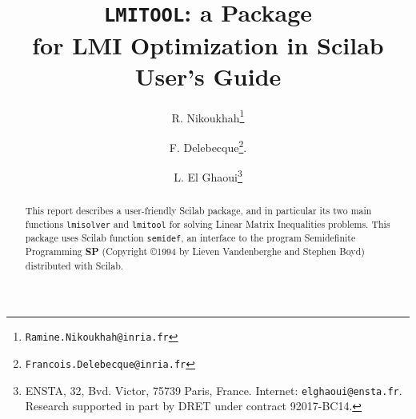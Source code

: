 \documentclass{article}
\begin{document}
\def\lmitool{{\tt LMITOOL}}
\def\dsp{\displaystyle}
\def\reals{{\bf R}}
\def\BEQ{\begin{equation}}
\def\EEQ{\end{equation}}
\def\eg{{\em e.g.}}
\def\ie{{\em i.e.}}
\def\Tr{{\mathop{\bf Tr}}}
\def\diag{{\mathop{\bf diag}}}
\def\eqbydef{\mathrel{\stackrel{\Delta}{=}}}

\title{\lmitool:
a Package \\ for LMI Optimization in Scilab\\[0.5in]
User's Guide}
\date{}
\author{R. Nikoukhah\thanks{{\tt Ramine.Nikoukhah@inria.fr}}
\and
F. Delebecque\thanks{\tt Francois.Delebecque@inria.fr}.  
\and
L. El Ghaoui\thanks{ENSTA, 32, Bvd. Victor, 75739 Paris, France.
Internet: {\tt elghaoui@ensta.fr}.  Research supported in part by DRET
under contract  92017-BC14.}
}

\maketitle

\begin{abstract}
This report describes a user-friendly Scilab package, and in
particular its two main functions {\tt lmisolver} and
{\tt lmitool} for solving
Linear Matrix Inequalities problems.  This package
uses Scilab function {\tt semidef}, an interface to the program 
Semidefinite Programming {\bf SP} (Copyright \copyright 1994 by Lieven
Vandenberghe and Stephen Boyd) distributed with Scilab. 
\end{abstract}

\tableofcontents

\newpage
\end{document}
